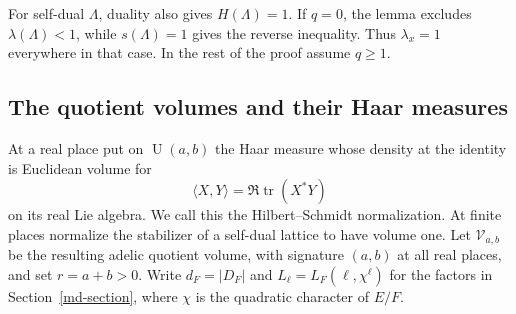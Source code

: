 For self-dual $\Lambda$, duality also gives $H(\Lambda)=1$.
If $q=0$, the lemma excludes $\lambda(\Lambda)<1$, while
$s(\Lambda)=1$ gives the reverse inequality.  Thus
$\lambda_x=1$ everywhere in that case.  In the rest of the
proof assume $q\ge1$.

\subsection{The quotient volumes and their Haar measures}

At a real place put on $\operatorname U(a,b)$ the Haar
measure whose density at the identity is Euclidean volume
for
\[
       \langle X,Y\rangle=\Re\operatorname{tr}(X^*Y)
\]
on its real Lie algebra.  We call this the
Hilbert--Schmidt normalization.  At finite places normalize
the stabilizer of a self-dual lattice to have volume one.
Let $\mathcal V_{a,b}$ be the resulting adelic quotient
volume, with signature $(a,b)$ at all real places, and set
$r=a+b>0$.
Write $d_F=|D_F|$ and
$L_\ell=L_F(\ell,\chi^\ell)$ for the factors in
Section~\ref{md-section}, where $\chi$ is the quadratic
character of $E/F$.

